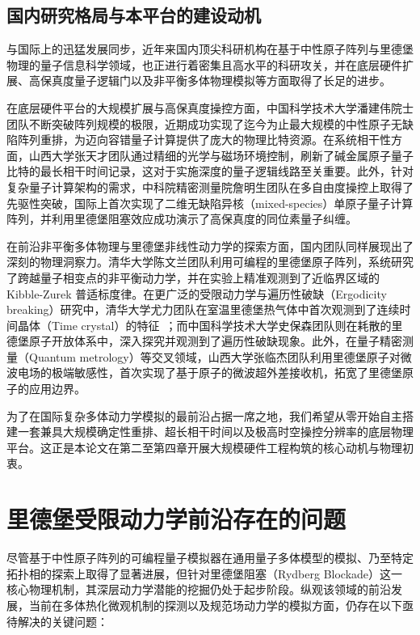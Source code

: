 \documentclass[../main.tex]{subfiles}
\begin{document}
\subsection{国内研究格局与本平台的建设动机}
\label{ch1:subsec:domestic_status}

与国际上的迅猛发展同步，近年来国内顶尖科研机构在基于中性原子阵列与里德堡物理的量子信息科学领域，也正进行着密集且高水平的科研攻关，并在底层硬件扩展、高保真度量子逻辑门以及非平衡多体物理模拟等方面取得了长足的进步。

在底层硬件平台的大规模扩展与高保真度操控方面，中国科学技术大学潘建伟院士团队不断突破阵列规模的极限，近期成功实现了迄今为止最大规模的中性原子无缺陷阵列重排\cite{lin2025ai}，为迈向容错量子计算提供了庞大的物理比特资源。在系统相干性方面，山西大学张天才团队通过精细的光学与磁场环境控制，刷新了碱金属原子量子比特的最长相干时间记录\cite{tian2024extending}，这对于实施深度的量子逻辑线路至关重要。此外，针对复杂量子计算架构的需求，中科院精密测量院詹明生团队在多自由度操控上取得了先驱性突破，国际上首次实现了二维无缺陷异核（mixed-species）单原子量子计算阵列，并利用里德堡阻塞效应成功演示了高保真度的同位素量子纠缠\cite{zeng2017entangling, sheng2022defect}。

在前沿非平衡多体物理与里德堡非线性动力学的探索方面，国内团队同样展现出了深刻的物理洞察力。清华大学陈文兰团队利用可编程的里德堡原子阵列，系统研究了跨越量子相变点的非平衡动力学，并在实验上精准观测到了近临界区域的 Kibble-Zurek 普适标度律\cite{zhang2025observation}。在更广泛的受限动力学与遍历性破缺（Ergodicity breaking）研究中，清华大学尤力团队在室温里德堡热气体中首次观测到了连续时间晶体（Time crystal）的特征~\cite{wu2024dissipative}；而中国科学技术大学史保森团队则在耗散的里德堡原子开放体系中，深入探究并观测到了遍历性破缺现象\cite{ding2024ergodicity}。此外，在量子精密测量（Quantum metrology）等交叉领域，山西大学张临杰团队利用里德堡原子对微波电场的极端敏感性，首次实现了基于原子的微波超外差接收机\cite{jing2020atomic}，拓宽了里德堡原子的应用边界。

为了在国际复杂多体动力学模拟的最前沿占据一席之地，我们希望从零开始自主搭建一套兼具大规模确定性重排、超长相干时间以及极高时空操控分辨率的底层物理平台。这正是本论文在第二至第四章开展大规模硬件工程构筑的核心动机与物理初衷。


\section{里德堡受限动力学前沿存在的问题}
\label{ch1:sec:problems}

尽管基于中性原子阵列的可编程量子模拟器在通用量子多体模型的模拟、乃至特定拓扑相的探索上取得了显著进展，但针对里德堡阻塞（Rydberg Blockade）这一核心物理机制，其深层动力学潜能的挖掘仍处于起步阶段。纵观该领域的前沿发展，当前在多体热化微观机制的探测以及规范场动力学的模拟方面，仍存在以下亟待解决的关键问题：
\end{document}
